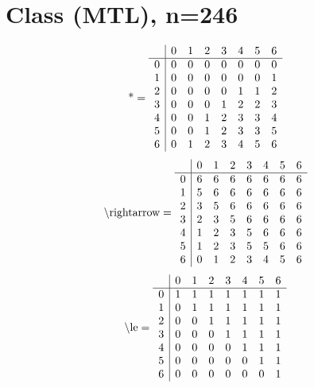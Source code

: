 \documentclass[11pt]{article}
\begin{document}
\section{Class (MTL), n=246}
\[\text{*} = 
\begin{array}{r | r r r r r r r}
 & 0 & 1 & 2 & 3 & 4 & 5 & 6 \\ \hline
0 & 0 & 0 & 0 & 0 & 0 & 0 & 0 \\
1 & 0 & 0 & 0 & 0 & 0 & 0 & 1 \\
2 & 0 & 0 & 0 & 0 & 1 & 1 & 2 \\
3 & 0 & 0 & 0 & 1 & 2 & 2 & 3 \\
4 & 0 & 0 & 1 & 2 & 3 & 3 & 4 \\
5 & 0 & 0 & 1 & 2 & 3 & 3 & 5 \\
6 & 0 & 1 & 2 & 3 & 4 & 5 & 6 \\
\end{array}
\]
\[\text{\textbackslash rightarrow} = 
\begin{array}{r | r r r r r r r}
 & 0 & 1 & 2 & 3 & 4 & 5 & 6 \\ \hline
0 & 6 & 6 & 6 & 6 & 6 & 6 & 6 \\
1 & 5 & 6 & 6 & 6 & 6 & 6 & 6 \\
2 & 3 & 5 & 6 & 6 & 6 & 6 & 6 \\
3 & 2 & 3 & 5 & 6 & 6 & 6 & 6 \\
4 & 1 & 2 & 3 & 5 & 6 & 6 & 6 \\
5 & 1 & 2 & 3 & 5 & 5 & 6 & 6 \\
6 & 0 & 1 & 2 & 3 & 4 & 5 & 6 \\
\end{array}
\]
\[\text{\textbackslash le} = 
\begin{array}{r | r r r r r r r}
 & 0 & 1 & 2 & 3 & 4 & 5 & 6 \\ \hline
0 & 1 & 1 & 1 & 1 & 1 & 1 & 1 \\
1 & 0 & 1 & 1 & 1 & 1 & 1 & 1 \\
2 & 0 & 0 & 1 & 1 & 1 & 1 & 1 \\
3 & 0 & 0 & 0 & 1 & 1 & 1 & 1 \\
4 & 0 & 0 & 0 & 0 & 1 & 1 & 1 \\
5 & 0 & 0 & 0 & 0 & 0 & 1 & 1 \\
6 & 0 & 0 & 0 & 0 & 0 & 0 & 1 \\
\end{array}
\]
\end{document}

